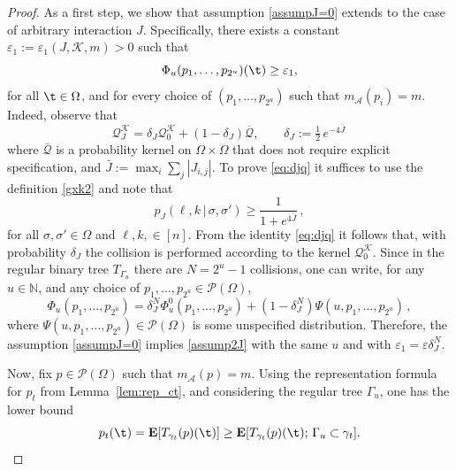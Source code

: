 \documentclass[11pt,reqno]{amsart}
\numberwithin{equation}{section}
\numberwithin{figure}{section}
\renewcommand{\geq}{\ge} %
\newcommand{\1}{\mathds{1}}
\newcommand{\tc}{\,|\,}
\let\e=\varepsilon \let\f=\varphi \let\l=\lambda
\let\si=\sigma
\let\O=\Omega
\let\G=\Gamma
\newcommand{\cA}{\ensuremath{\mathcal A}}
\newcommand{\cP}{\ensuremath{\mathcal P}}
\newcommand{\bbN}{{\ensuremath{\mathbb N}} }
\begin{document}
\begin{proof}
As a first step, we show that assumption \eqref{assumpJ=0} extends to the case of arbitrary interaction \(J\). Specifically, there exists a constant \(\varepsilon_1 := \varepsilon_1(J, \mathcal{K}, m) > 0\) %
such that
\begin{equation}\label{assump2J}
    \Phi_{u}(p_1,\dots,p_{2^u})(\t) \geq \varepsilon_1,
\end{equation}
for all $\t\in\O$, and for every choice of  \( (p_1, \ldots, p_{2^u})\) such that $m_\cA(p_i)=m$. Indeed, 
observe that 
\begin{equation}\label{eq:djq}
    \mathcal{Q}_J^\mathcal{K} = \delta_J \mathcal{Q}_0^\mathcal{K} + (1 - \delta_J) \overline{\mathcal{Q}},\qquad \delta_J := \tfrac12\,e^{-4\bar J}\,
\end{equation}
where \(\overline{\mathcal{Q}}\) is a probability kernel on \(\Omega \times \Omega\) that does not require explicit specification, and  $\bar J:=\max_i\sum_j|J_{i,j}|$. To prove \eqref{eq:djq} it suffices to use the definition \eqref{gxk2} and note that %
\begin{equation}
p_J(\ell,k\tc\si,\si')\geq \frac1{1+e^{4\bar J}}\,,
\end{equation}
for all \(\sigma, \sigma' \in \Omega\) and \(\ell, k,  \in [n]\). From the identity \eqref{eq:djq} it follows that, %
with probability $\delta_J$ the collision is performed according to the kernel $\mathcal{Q}_0^\mathcal{K}$. Since in the regular binary tree $T_{\G_u}$ there are $N=2^u-1$ collisions, one can write, 
for any $u\in\bbN$, and any choice of $p_1,\dots,p_{2^u}\in\cP(\O)$, 
\begin{equation}\label{eq:djqq}
   \Phi_u(p_1,\dots,p_{2^u})= \delta_J^N \Phi^0_u(p_1,\dots,p_{2^u}) + (1- \delta_J^N ) \Psi(u, p_1,\dots,p_{2^u})
   \,,
\end{equation}
where $\Psi(u, p_1,\dots,p_{2^u})\in\cP(\O)$ is some unspecified distribution.  
Therefore, the assumption \eqref{assumpJ=0}  implies \eqref{assump2J} with the same $u$ and with $\e_1= \e\delta_J^N$. 

Now, fix \(p \in \mathcal{P}(\Omega)\) such that \(m_{\mathcal{A}}(p) = m\). Using the representation formula for \(p_t\) from Lemma~\ref{lem:rep_ct}, and considering the regular tree \({\G_u}\), one has the lower bound
\begin{equation}
    p_t(\t) = {\bf E}[T_{\gamma_t}(p)(\t)] \geq {\bf E}[T_{\gamma_t}(p)(\t) ;\,{\G_u} \subset \gamma_t].
\end{equation}


\end{proof}
\end{document}
